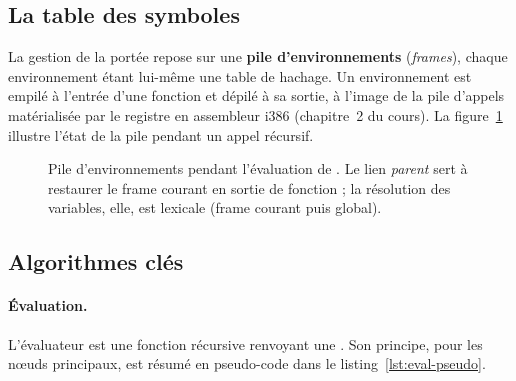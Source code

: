 \subsection{La table des symboles}

La gestion de la portée repose sur une \textbf{pile d'environnements} (\emph{frames}),
chaque environnement étant lui-même une table de hachage. Un environnement est
empilé à l'entrée d'une fonction et dépilé à sa sortie, à l'image de la pile
d'appels matérialisée par le registre  en assembleur i386 (chapitre~2
du cours). La figure~\ref{fig:frames} illustre l'état de la pile pendant un appel
récursif.

\begin{figure}[ht]
\centering
{}
\caption{Pile d'environnements pendant l'évaluation de . Le lien
\emph{parent} sert à restaurer le frame courant en sortie de fonction ; la
résolution des variables, elle, est lexicale (frame courant puis global).}
\label{fig:frames}
\end{figure}

\subsection{Algorithmes clés}

\paragraph{Évaluation.} L'évaluateur est une fonction récursive renvoyant une
. Son principe, pour les n\oe uds principaux, est résumé en
pseudo-code dans le listing~\ref{lst:eval-pseudo}.

